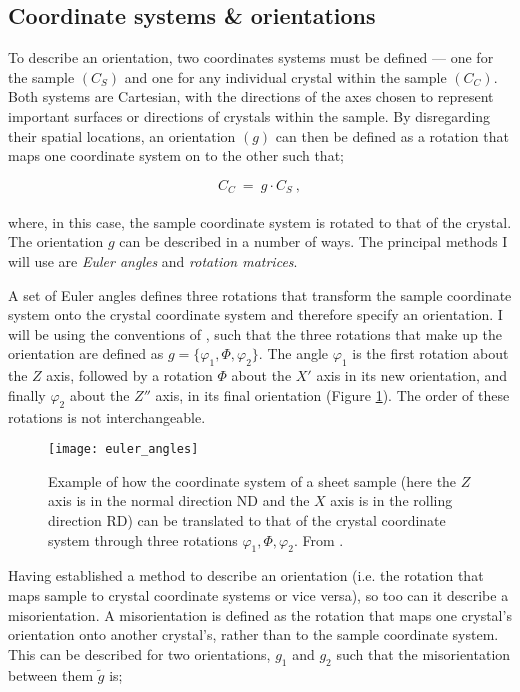 \documentclass[a4paper,12pt,twoside]{report}
\numberwithin{equation}{chapter}
\begin{document}
\subsection{Coordinate systems \& orientations} \label{subsec:coordinates}
To describe an orientation, two coordinates systems must be defined --- one for the sample $(C_S)$ and one for any individual crystal within the sample $(C_C)$. Both systems are Cartesian, with the directions of the axes chosen to represent important surfaces or directions of crystals within the sample. By disregarding their spatial locations, an orientation $(g)$ can then be defined as a rotation that maps one coordinate system on to the other such that;



\begin{equation}
C_C\ =\ g \cdot C_S\ ,
\end{equation}  
\\
where, in this case, the sample coordinate system is rotated to that of the crystal. The orientation $g$ can be described in a number of ways. The principal methods I will use are \emph{Euler angles} and \emph{rotation matrices}.


A set of Euler angles defines three rotations that transform the sample coordinate system onto the crystal coordinate system and therefore specify an orientation. I will be using the conventions of \cite{bunge1982texture}, such that the three rotations that make up the orientation are defined as $g = \{\varphi_1,\Phi,\varphi_2\}$. The angle $\varphi_1$ is the first rotation about the $Z$ axis, followed by a rotation $\Phi$ about the $X'$ axis in its new orientation, and finally $\varphi_2$ about the $Z''$ axis, in its final orientation (Figure \ref{fig:euler_angles}). The order of these rotations is not interchangeable.




\begin{figure}[h!]
  \centering
    \texttt{[image: euler\_angles]}
  \caption[Euler angle description]{Example of how the coordinate system of a sheet sample (here the $Z$ axis is in the normal direction ND and the $X$ axis is in the rolling direction RD) can be translated to that of the crystal coordinate system through three rotations $\varphi_1,\Phi,\varphi_2$. From \cite{Randle2000}.}
  \label{fig:euler_angles}
\end{figure}

Having established a method to describe an orientation (i.e. the rotation that maps sample to crystal coordinate systems or vice versa), so too can it describe a misorientation. A misorientation is defined as the rotation that maps one crystal's orientation onto another crystal's, rather than to the sample coordinate system. This can be described for two orientations, $g_1$ and $g_2$ such that the misorientation between them $\tilde{g}$ is;
\end{document}
